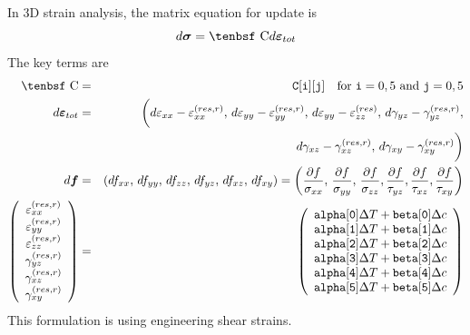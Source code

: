 \documentclass[11pt]{book}
\renewcommand{\vec}[1]{\boldsymbol{#1}}
\def\C{\hbox{\tenbsf C}}
\def\code#1{{\small\tt #1}}
\def\deff{d \vec{\varepsilon}_{tot}}
\def\df{d \vec{f}}
\def\dsig{d \vec{\sigma}}
\def\DT{\Delta T}
\def\e#1{\varepsilon_{#1}}
\def\er#1{\varepsilon_{#1}^{(res)}}
\def\err#1{\varepsilon_{#1}^{(res,r)}}
\def\g#1{\gamma_{#1}}
\begin{document}
In 3D strain analysis, the matrix equation for update is
\begin{equation}
    \dsig = \C \deff 
\end{equation}
The key terms are
\begin{eqnarray}
      \C & = & \code{C[i][j]} \quad {\rm for\ }\code{i}=0,5\ {\rm and\ }\code{j}=0,5 \\
       \deff & = & \biggl(d\e{xx} - \err{xx}, \thinspace d\e{yy} - \err{yy}, \thinspace  d\e{yy}-  \er{zz}, 
             \thinspace d\g{yz}-\gamma_{yz}^{(res,r)},  \nonumber\\
             && \qquad\mbox{} \thinspace d\g{xz}-\gamma_{xz}^{(res,r)},  \thinspace d\g{xy}-\gamma_{xy}^{(res,r)}\biggr) \\
      \df & = & (df_{xx}, \thinspace df_{yy}, \thinspace df_{zz}, \thinspace df_{yz}, \thinspace df_{xz}, \thinspace df_{xy})
                  = \left({\partial f\over \sigma_{xx}}, \thinspace {\partial f\over \sigma_{yy}}, \thinspace {\partial f\over \sigma_{zz}},
                                {\partial f\over \tau_{yz}}, {\partial f\over \tau_{xz}}, {\partial f\over \tau_{xy}}\right)  \\
\left(\begin{array}{c} \err{xx} \\ \err{yy} \\ \err{zz} \\  \gamma_{yz}^{(res,r)} \\ \gamma_{xz}^{(res,r)} \\ \gamma_{xy}^{(res,r)} \end{array}\right)
       & = &  \left(\begin{array}{c}
	\code{alpha[0]}\DT + \code{beta[0]}\Delta c \\
	\code{alpha[1]}\DT + \code{beta[1]}\Delta c \\
	\code{alpha[2]}\DT + \code{beta[2]}\Delta c \\
	\code{alpha[3]}\DT + \code{beta[3]}\Delta c \\
	\code{alpha[4]}\DT + \code{beta[4]}\Delta c \\
	\code{alpha[5]}\DT + \code{beta[5]}\Delta c 
 \end{array}\right) 
 \end{eqnarray}
This formulation is using engineering shear strains. 
 
\end{document}
